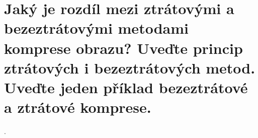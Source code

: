 \section{Jaký je rozdíl mezi ztrátovými a bezeztrátovými metodami komprese obrazu? Uveďte princip ztrátových i 
bezeztrátových metod. Uveďte jeden příklad bezeztrátové a ztrátové komprese.}.